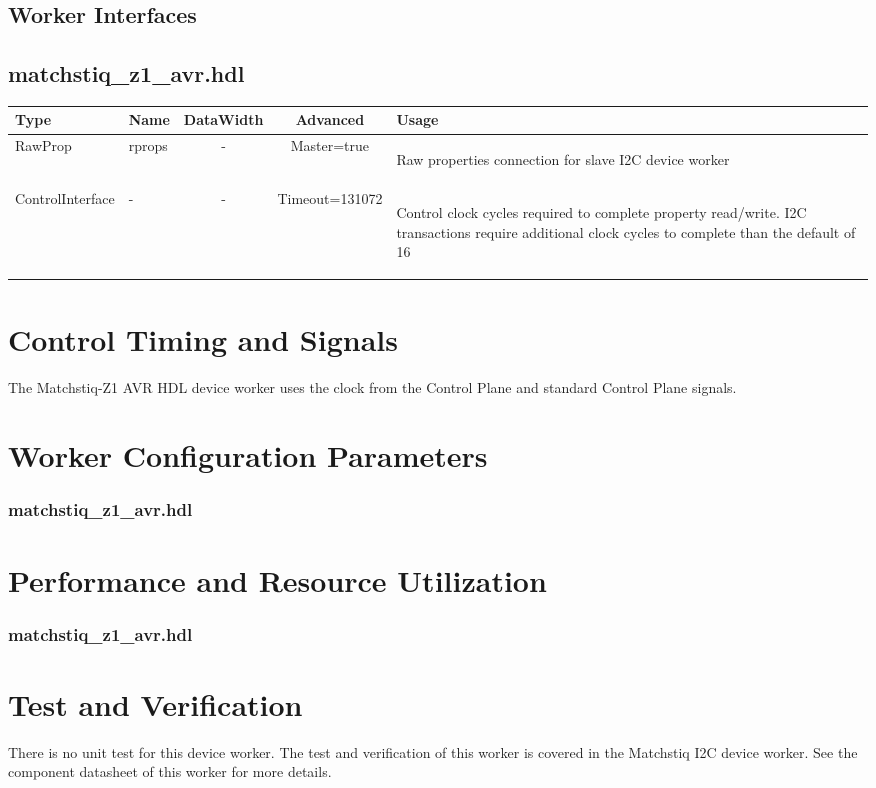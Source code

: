 \documentclass{article}
\def\comp{matchstiq\_z1\_avr}
\edef\ecomp{matchstiq_z1_avr}
\def\Comp{Matchstiq-Z1 AVR}
\begin{document}
\begin{landscape}
	\section*{Worker Interfaces}
	\subsection*{\comp.hdl}
	\begin{scriptsize}
		\begin{tabular}{|M{2cm}|M{1.5cm}|c|c|M{12cm}|}
			\hline
			Type & Name & DataWidth & Advanced & Usage \\
			\hline
			RawProp
			& rprops
			& -
			& Master=true
			& \begin{flushleft}Raw properties connection for slave I2C device worker\end{flushleft}\\
			\hline
			ControlInterface
			& -
			& -
			& Timeout=131072
			& \begin{flushleft}Control clock cycles required to complete property  read/write. I2C transactions require additional clock cycles to complete than the default of 16 \end{flushleft}\\
			\hline
		\end{tabular}
	\end{scriptsize}
\end{landscape}

\section*{Control Timing and Signals}
The \Comp{} HDL device worker uses the clock from the Control Plane and standard Control Plane signals.

\begin{landscape}
\section*{Worker Configuration Parameters}
\subsubsection*{\comp.hdl}
%
\section*{Performance and Resource Utilization}
\subsubsection*{\comp.hdl}
%
\end{landscape}

\section*{Test and Verification}
There is no unit test for this device worker. The test and verification of this worker is covered in the Matchstiq I2C device worker. See the component datasheet of this worker for more details.
\end{document}
